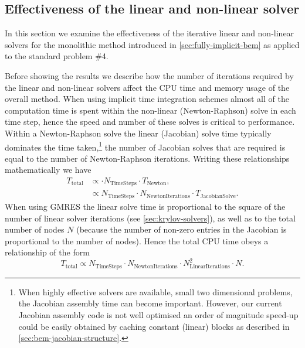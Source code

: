 \subsection{Effectiveness of the linear and non-linear solver}
\label{sec:effect-line-non}

In this section we examine the effectiveness of the iterative linear and non-linear solvers for the monolithic method introduced in \cref{sec:fully-implicit-bem} as applied to the \mumag standard problem \#4.

\label{mem-cpu-solver-correction}
Before showing the results we describe how the number of iterations required by the linear and non-linear solvers affect the CPU time and memory usage of the overall method.
When using implicit time integration schemes almost all of the computation time is spent within the non-linear (\ie Newton-Raphson) solve in each time step, hence the speed and number of these solves is critical to performance.
Within a Newton-Raphson solve the linear (Jacobian) solve time typically dominates the time taken,\footnote{When highly effective solvers are available, \ie small two dimensional problems, the Jacobian assembly time can become important.
However, our current Jacobian assembly code is not well optimised \eg an order of magnitude speed-up could be easily obtained by caching constant (linear) blocks as described in \cref{sec:bem-jacobian-structure}.}
the number of Jacobian solves that are required is equal to the number of Newton-Raphson iterations.
Writing these relationships mathematically we have
\begin{equation}
  \begin{aligned}
    T_\mathrm{total} &\propto \cdot N_\mathrm{TimeSteps} \cdot T_\mathrm{Newton}, \\
                     &\propto N_\mathrm{TimeSteps} \cdot N_\mathrm{NewtonIterations} \cdot T_\mathrm{JacobianSolve}.
  \end{aligned}
\end{equation}
When using GMRES the linear solve time is proportional to the square of the number of linear solver iterations (see \cref{sec:krylov-solvers}), as well as to the total number of nodes $N$ (because the number of non-zero entries in the Jacobian is proportional to the number of nodes).
Hence the total CPU time obeys a relationship of the form
\begin{equation}
  T_\mathrm{total} \propto N_\mathrm{TimeSteps} \cdot N_\mathrm{NewtonIterations} \cdot N_\mathrm{LinearIterations}^2 \cdot N.
\end{equation}

